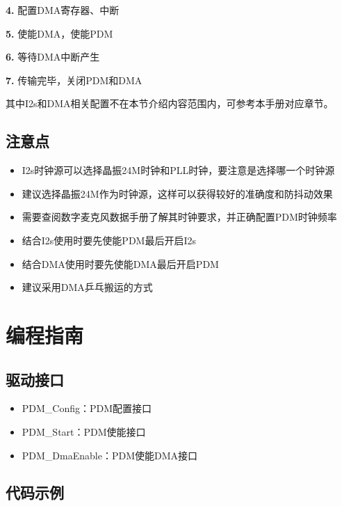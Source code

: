 \documentclass[
  12pt,
]{book}
\begin{document}
\textbf{4.} 配置DMA寄存器、中断

\textbf{5.} 使能DMA，使能PDM

\textbf{6.} 等待DMA中断产生

\textbf{7.} 传输完毕，关闭PDM和DMA

其中I2s和DMA相关配置不在本节介绍内容范围内，可参考本手册对应章节。

\hypertarget{ux6ce8ux610fux70b9-2}{%
\subsection{注意点}\label{ux6ce8ux610fux70b9-2}}

\begin{itemize}
\item
  I2s时钟源可以选择晶振24M时钟和PLL时钟，要注意是选择哪一个时钟源
\item
  建议选择晶振24M作为时钟源，这样可以获得较好的准确度和防抖动效果
\item
  需要查阅数字麦克风数据手册了解其时钟要求，并正确配置PDM时钟频率
\item
  结合I2s使用时要先使能PDM最后开启I2s
\item
  结合DMA使用时要先使能DMA最后开启PDM
\item
  建议采用DMA乒乓搬运的方式
\end{itemize}

\hypertarget{ux7f16ux7a0bux6307ux5357-2}{%
\section{编程指南}\label{ux7f16ux7a0bux6307ux5357-2}}

\hypertarget{ux9a71ux52a8ux63a5ux53e3-2}{%
\subsection{驱动接口}\label{ux9a71ux52a8ux63a5ux53e3-2}}

\begin{itemize}
\item
  PDM\_Config：PDM配置接口
\item
  PDM\_Start：PDM使能接口
\item
  PDM\_DmaEnable：PDM使能DMA接口
\end{itemize}

\hypertarget{ux4ee3ux7801ux793aux4f8b-2}{%
\subsection{代码示例}\label{ux4ee3ux7801ux793aux4f8b-2}}
\end{document}
